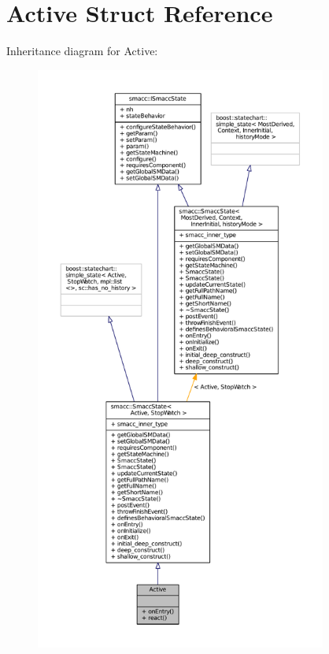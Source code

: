 \hypertarget{structActive}{}\section{Active Struct Reference}
\label{structActive}


Inheritance diagram for Active\+:
\nopagebreak
\begin{figure}[H]
\begin{center}
\leavevmode
\includegraphics[height=550pt]{structActive__inherit__graph}
\end{center}
\end{figure}


